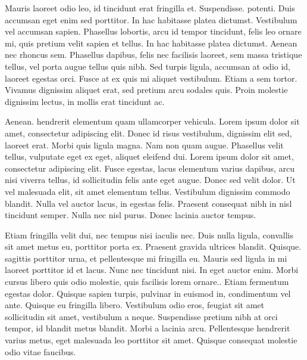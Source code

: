 

 Mauris laoreet odio leo, id tincidunt erat fringilla et. Suspendisse. potenti. Duis accumsan eget enim sed porttitor. In hac habitasse platea dictumst. Vestibulum vel accumsan sapien. Phasellus lobortis, arcu id tempor tincidunt, felis leo ornare mi, quis pretium velit sapien et tellus. In hac habitasse platea dictumst. Aenean nec rhoncus sem. Phasellus dapibus, felis nec facilisis laoreet, sem massa tristique tellus, vel porta augue tellus quis nibh. Sed turpis ligula, accumsan at odio id, laoreet egestas orci. Fusce at ex quis mi aliquet vestibulum. Etiam a sem tortor. Vivamus dignissim aliquet erat, sed pretium arcu sodales quis. Proin molestie dignissim lectus, in mollis erat tincidunt ac.

Aenean. hendrerit elementum quam ullamcorper vehicula. Lorem ipsum dolor sit amet, consectetur adipiscing elit. Donec id risus vestibulum, dignissim elit sed, laoreet erat. Morbi quis ligula magna. Nam non quam augue. Phasellus velit tellus, vulputate eget ex eget, aliquet eleifend dui. Lorem ipsum dolor sit amet, consectetur adipiscing elit. Fusce egestas, lacus elementum varius dapibus, arcu nisi viverra tellus, id sollicitudin felis ante eget augue. Donec sed velit dolor. Ut vel malesuada elit, sit amet elementum tellus. Vestibulum dignissim commodo blandit. Nulla vel auctor lacus, in egestas felis. Praesent consequat nibh in nisl tincidunt semper. Nulla nec nisl purus. Donec lacinia auctor tempus.

Etiam fringilla velit dui, nec tempus nisi iaculis nec. Duis nulla ligula, convallis sit amet metus eu, porttitor porta ex. Praesent gravida ultrices blandit. Quisque. sagittis porttitor urna, et pellentesque mi fringilla eu. Mauris sed ligula in mi laoreet porttitor id et lacus. Nunc nec tincidunt nisi. In eget auctor enim. Morbi cursus libero quis odio molestie, quis facilisis lorem ornare.. Etiam fermentum egestas dolor. Quisque sapien turpis, pulvinar in euismod in, condimentum vel ante. Quisque eu fringilla libero. Vestibulum odio eros, feugiat sit amet sollicitudin sit amet, vestibulum a neque. Suspendisse pretium nibh at orci tempor, id blandit metus blandit. Morbi a lacinia arcu. Pellentesque hendrerit varius metus, eget malesuada leo porttitor sit amet. Quisque consequat molestie odio vitae faucibus. 


